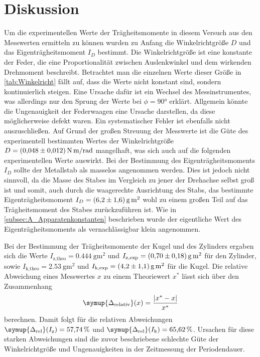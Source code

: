\section{Diskussion}
\label{sec:Diskussion}
Um die experimentellen Werte der Trägheitsmomente in diesem Versuch aus den Messwerten ermitteln zu können wurden zu Anfang die Winkelrichtgröße $D$ und das Eigenträgheitsmoment
$I_D$ bestimmt. Die Winkelrichtgröße ist eine konstante der Feder, die eine Proportionalität zwischen Auslenkwinkel und dem wirkenden Drehmoment beschreibt. Betrachtet man die
einzelnen Werte dieser Größe in \autoref{tab:Winkelricht} fällt auf, dass die Werte nicht konstant sind, sondern kontinuierlich steigen. Eine Ursache dafür ist ein Wechsel des 
Messinstrumentes, was allerdings nur den Sprung der Werte bei $\phi = 90°$ erklärt. Allgemein könnte die Ungenauigkeit der Federwaagen eine Ursache darstellen, da diese 
möglicherweise defekt waren. Ein systematischer Fehler ist ebenfalls nicht auszuschließen. Auf Grund der großen Streuung der Messwerte ist die Güte des experimentell bestimmten 
Wertes der Winkelrichtgröße $D = \qty{0.048 +- 0.012}{\newton\metre\per\radian}$ mangelhaft, was sich auch auf die folgenden experimentellen Werte auswirkt. Bei der Bestimmung 
des Eigenträgheitsmoments $I_D$ sollte der Metallstab als masselos angenommen werden. Dies ist jedoch nicht sinnvoll, da die Masse des Stabes im Vergleich zu jener der Drehachse
selbst groß ist und somit, auch durch die waagerechte Ausrichtung des Stabs, das bestimmte Eigenträgheitsmoment $I_D = \qty{6.2 +- 1.6}{\gram\square\metre}$ wohl zu einem großen
Teil auf das Trägheitsmoment des Stabes zurückzuführen ist. Wie in \autoref{subsec:A_Apparatenkonstanten} beschrieben wurde der eigentliche Wert des Eigenträgheitsmoments als vernachlässigbar
klein angenommen.

Bei der Bestimmung der Trägheitsmomente der Kugel und des Zylinders ergaben sich die Werte $I_{\text{z,theo}} = \qty{0.444}{\gram\metre\squared}$ und 
$I_{\text{z,exp}} = \qty{0.70+-0.18}{\gram\metre\squared}$ für den Zylinder, sowie $I_{\text{k,theo}} = \qty{2.53}{\gram\metre\squared}$ und 
$I_{\text{k,exp}} = \qty{4.2+-1.1}{\gram\metre\squared}$ für die Kugel. Die relative Abweichung eines Messwertes $x$ zu einem Theoriewert $x^*$ lässt sich über den
Zusammenhang
\begin{equation}
    \label{eqn:rel_Abw}
    \symup{\Delta_\text{relativ}}(x) = \frac{|x^* - x|}{x^*}
\end{equation}
berechnen. Damit folgt für die relativen Abweichungen $\symup{\Delta_\text{rel}}(I_\text{z}) = \qty{57.74}{\percent}$ und 
$\symup{\Delta_\text{rel}}(I_\text{k}) = \qty{65.62}{\percent}$. Ursachen für diese starken Abweichungen sind die zuvor beschriebene schlechte Güte der Winkelrichtgröße und 
Ungenauigkeiten in der Zeitmessung der Periodendauer.

